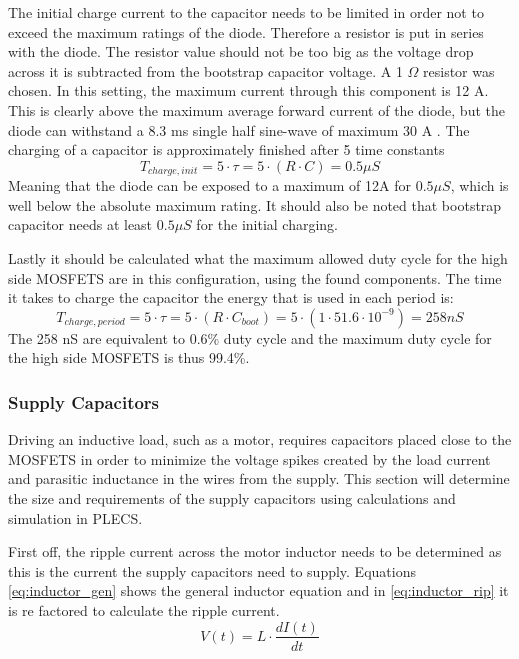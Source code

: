 The initial charge current to the capacitor needs to be limited in order not to exceed the maximum ratings of the diode.
Therefore a resistor is put in series with the diode.
The resistor value should not be too big as the voltage drop across it is subtracted from the bootstrap capacitor voltage.
A 1 $\Omega$ resistor was chosen. In this setting, the maximum current through this component is 12 A.
This is clearly above the maximum average forward current of the diode, but the diode can withstand a 8.3 ms single half sine-wave of maximum 30 A \cite{diode_ds}.
The charging of a capacitor is approximately finished after 5 time constants
\begin{equation}
T_{charge,init} = 5\cdot \tau = 5\cdot (R \cdot C) = 0.5 \mu S 
\end{equation}
Meaning that the diode can be exposed to a maximum of 12A for $0.5 \mu S $, which is well below the absolute maximum rating.
It should also be noted that bootstrap capacitor needs at least $0.5 \mu S $ for the initial charging.


Lastly it should be calculated what the maximum allowed duty cycle for the high side MOSFETS are in this configuration, using the found components.
The time it takes to charge the capacitor the energy that is used in each period is:
\begin{equation}
	T_{charge,period} = 5\cdot \tau = 5\cdot (R \cdot C_{boot}) = 5\cdot (1 \cdot  51.6 \cdot 10^{-9}) = 258 nS 
\end{equation}
The 258 nS are equivalent to 0.6\% duty cycle and the maximum duty cycle for the high side MOSFETS is thus 99.4\%.


\subsubsection{Supply Capacitors}
\label{ssub:sup_caps}
Driving an inductive load, such as a motor, requires capacitors placed close to the MOSFETS in order to minimize the voltage spikes created by the load current and parasitic inductance in the wires from the supply.
This section will determine the size and requirements of the supply capacitors using calculations and simulation in PLECS.

First off, the ripple current across the motor inductor needs to be determined as this is the current the supply capacitors need to supply.
Equations \ref{eq:inductor_gen} shows the general inductor equation and in \ref{eq:inductor_rip} it is re factored to calculate the ripple current.
\begin{equation}
	V(t) = L \cdot \frac{dI(t)}{dt}
	\label{eq:inductor_gen}
\end{equation}

